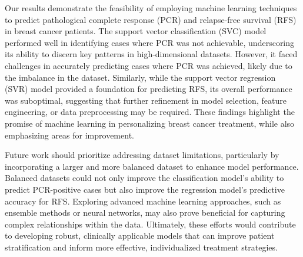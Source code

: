 \documentclass{article}
\begin{document}
Our results demonstrate the feasibility of employing machine learning techniques to predict pathological complete response (PCR) and relapse-free survival (RFS) in breast cancer patients. The support vector classification (SVC) model performed well in identifying cases where PCR was not achievable, underscoring its ability to discern key patterns in high-dimensional datasets. However, it faced challenges in accurately predicting cases where PCR was achieved, likely due to the imbalance in the dataset. Similarly, while the support vector regression (SVR) model provided a foundation for predicting RFS, its overall performance was suboptimal, suggesting that further refinement in model selection, feature engineering, or data preprocessing may be required. These findings highlight the promise of machine learning in personalizing breast cancer treatment, while also emphasizing areas for improvement.

Future work should prioritize addressing dataset limitations, particularly by incorporating a larger and more balanced dataset to enhance model performance. Balanced datasets could not only improve the classification model's ability to predict PCR-positive cases but also improve the regression model's predictive accuracy for RFS. Exploring advanced machine learning approaches, such as ensemble methods or neural networks, may also prove beneficial for capturing complex relationships within the data. Ultimately, these efforts would contribute to developing robust, clinically applicable models that can improve patient stratification and inform more effective, individualized treatment strategies.




\begin{table}[bp]
  \end{table}
\end{document}
